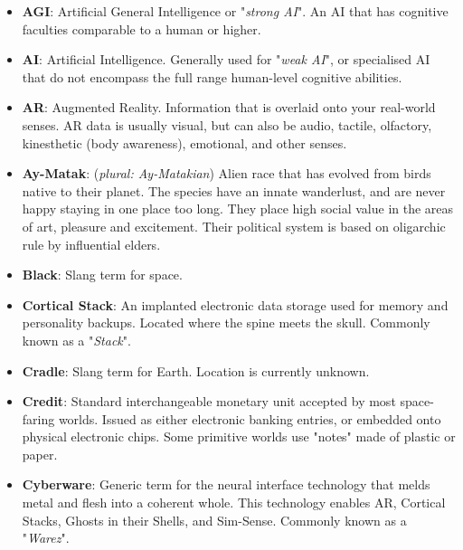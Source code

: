 \documentclass[10pt,twoside]{article}
\begin{document}
  \begin{multicols}{2}

  \begin{itemize}

    \item \textbf{AGI}: Artificial General Intelligence or "\textit{strong AI}". An AI that has cognitive faculties comparable to a human or higher.

    \item \textbf{AI}: Artificial Intelligence. Generally used for "\textit{weak AI}", or specialised AI that do not encompass the full range human-level cognitive abilities.

    \item \textbf{AR}: Augmented Reality. Information that is overlaid onto your real-world senses. AR data is usually visual, but can also be audio, tactile, olfactory, kinesthetic (body awareness), emotional, and other senses.

    \item \textbf{Ay-Matak}: (\textit{plural: Ay-Matakian}) Alien race that has evolved from birds native to their planet. The species have an innate wanderlust, and are never happy staying in one place too long. They place high social value in the areas of art, pleasure and excitement. Their political system is based on oligarchic rule by influential elders.

    \item \textbf{Black}: Slang term for space.

    \item \textbf{Cortical Stack}: An implanted electronic data storage used for memory and personality backups. Located where the spine meets the skull. Commonly known as a "\textit{Stack}".

    \item \textbf{Cradle}: Slang term for Earth. Location is currently unknown.

    \item \textbf{Credit}: Standard interchangeable monetary unit accepted by most space-faring worlds. Issued as either electronic banking entries, or embedded onto physical electronic chips. Some primitive worlds use "notes" made of plastic or paper.

    \item \textbf{Cyberware}: Generic term for the neural interface technology that melds metal and flesh into a coherent whole. This technology enables AR, Cortical Stacks, Ghosts in their Shells, and Sim-Sense. Commonly known as a "\textit{Warez}".


\end{itemize}
\end{multicols}
\end{document}
